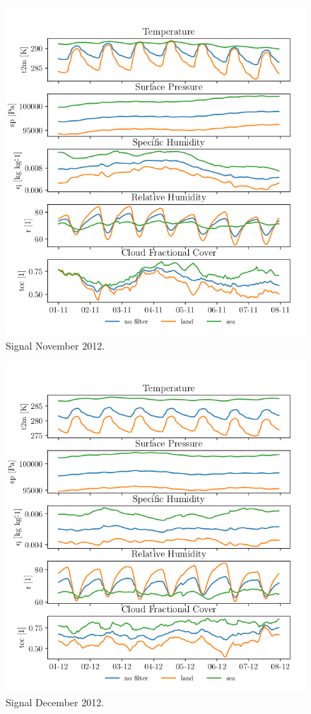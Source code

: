 \begin{figure}[ht]
    \centering
    \includegraphics{python_figs/spatially_averaged_one_week_from_2012-11-01.png}
    \caption{Signal November 2012.}
    \label{fig:nov12}
\end{figure}
\begin{figure}[ht]
    \centering
    \includegraphics{python_figs/spatially_averaged_one_week_from_2012-12-01.png}
    \caption{Signal December 2012.}
    \label{fig:dec12}
\end{figure}

